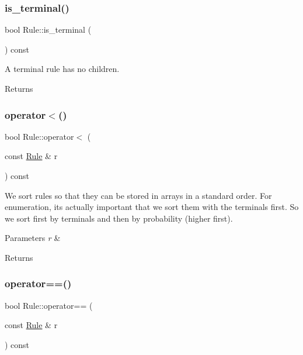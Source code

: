 \subsubsection{\texorpdfstring{is\+\_\+terminal()}{is\_terminal()}}
{\footnotesize\ttfamily bool Rule\+::is\+\_\+terminal (\begin{DoxyParamCaption}{ }\end{DoxyParamCaption}) const\hspace{0.3cm}{\ttfamily [inline]}}

A terminal rule has no children. \begin{DoxyReturn}{Returns}

\end{DoxyReturn}
\mbox{\label{class_rule_a706819fbede2c5a1b0b59f1d28cae30b}} 
\subsubsection{\texorpdfstring{operator$<$()}{operator<()}}
{\footnotesize\ttfamily bool Rule\+::operator$<$ (\begin{DoxyParamCaption}\item[{const \hyperlink{class_rule}{Rule} \&}]{r }\end{DoxyParamCaption}) const\hspace{0.3cm}{\ttfamily [inline]}}

We sort rules so that they can be stored in arrays in a standard order. For enumeration, it\textquotesingle{}s actually important that we sort them with the terminals first. So we sort first by terminals and then by probability (higher first). 
\begin{DoxyParams}{Parameters}
{\em r} & \\
\hline
\end{DoxyParams}
\begin{DoxyReturn}{Returns}

\end{DoxyReturn}
\mbox{\label{class_rule_a183fafc8a6b43515436a1de8f63ec98d}} 
\subsubsection{\texorpdfstring{operator==()}{operator==()}}
{\footnotesize\ttfamily bool Rule\+::operator== (\begin{DoxyParamCaption}\item[{const \hyperlink{class_rule}{Rule} \&}]{r }\end{DoxyParamCaption}) const\hspace{0.3cm}{\ttfamily [inline]}}

